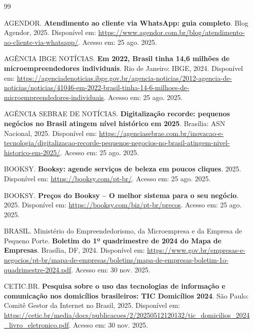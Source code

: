 \documentclass[12pt,a4paper]{article}
\begin{document}
\newpage


\renewcommand{\refname}{REFERÊNCIAS}
\begin{thebibliography}{99}

AGENDOR. \textbf{Atendimento ao cliente via WhatsApp: guia completo}. Blog Agendor, 2025. Disponível em: \url{https://www.agendor.com.br/blog/atendimento-ao-cliente-via-whatsapp/}. Acesso em: 25 ago. 2025.

AGÊNCIA IBGE NOTÍCIAS. \textbf{Em 2022, Brasil tinha 14,6 milhões de microempreendedores individuais}. Rio de Janeiro: IBGE, 2024. Disponível em: \url{https://agenciadenoticias.ibge.gov.br/agencia-noticias/2012-agencia-de-noticias/noticias/41046-em-2022-brasil-tinha-14-6-milhoes-de-microempreendedores-individuais}. Acesso em: 25 ago. 2025.

AGÊNCIA SEBRAE DE NOTÍCIAS. \textbf{Digitalização recorde: pequenos negócios no Brasil atingem nível histórico em 2025}. Brasília: ASN Nacional, 2025. Disponível em: \url{https://agenciasebrae.com.br/inovacao-e-tecnologia/digitalizacao-recorde-pequenos-negocios-no-brasil-atingem-nivel-historico-em-2025/}. Acesso em: 25 ago. 2025.

BOOKSY. \textbf{Booksy: agende serviços de beleza em poucos cliques}. 2025. Disponível em: \url{https://booksy.com/pt-br/}. Acesso em: 25 ago. 2025.

BOOKSY. \textbf{Preços do Booksy -- O melhor sistema para o seu negócio}. 2025. Disponível em: \url{https://booksy.com/biz/pt-br/precos}. Acesso em: 25 ago. 2025.

BRASIL. Ministério do Empreendedorismo, da Microempresa e da Empresa de Pequeno Porte. \textbf{Boletim do 1º quadrimestre de 2024 do Mapa de Empresas}. Brasília, DF, 2024. Disponível em: \url{https://www.gov.br/empresas-e-negocios/pt-br/mapa-de-empresas/boletins/mapa-de-empresas-boletim-1o-quadrimestre-2024.pdf}. Acesso em: 30 nov. 2025.

CETIC.BR. \textbf{Pesquisa sobre o uso das tecnologias de informação e comunicação nos domicílios brasileiros: TIC Domicílios 2024}. São Paulo: Comitê Gestor da Internet no Brasil, 2025. Disponível em: \url{https://cetic.br/media/docs/publicacoes/2/20250512120132/tic_domicilios_2024_livro_eletronico.pdf}. Acesso em: 30 nov. 2025.


\end{thebibliography}
\end{document}
